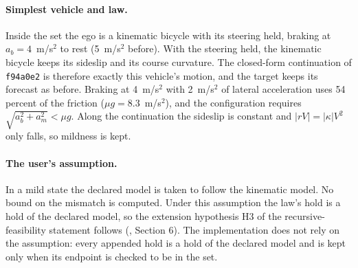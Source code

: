 \documentclass[11pt]{article}
\begin{document}
\paragraph{Simplest vehicle and law.}
Inside the set the ego is a kinematic bicycle with its steering held,
braking at $a_b=4$~m/s$^2$ to rest (5~m/s$^2$ before). With the steering
held, the kinematic bicycle keeps its sideslip and its course curvature. The
closed-form continuation of \texttt{f94a0e2} is therefore exactly this
vehicle's motion, and the target keeps its forecast as before. Braking at
4~m/s$^2$ with 2~m/s$^2$ of lateral acceleration uses 54 percent of the
friction ($\mu g=8.3$~m/s$^2$), and the configuration requires
$\sqrt{a_b^2+a_m^2}<\mu g$. Along the continuation the sideslip is constant
and $|rV|=|\kappa|V^2$ only falls, so mildness is kept.

\paragraph{The user's assumption.}
In a mild state the declared model is taken to follow the kinematic model.
No bound on the mismatch is computed. Under this assumption the law's hold
is a hold of the declared model, so the extension hypothesis H3 of the
recursive-feasibility statement follows
(, Section 6). The implementation does
not rely on the assumption: every appended hold is a hold of the declared
model and is kept only when its endpoint is checked to be in the set.
\end{document}
